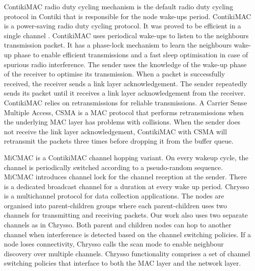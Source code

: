 ContikiMAC \cite{contikimac} radio duty cycling mechanism is the default radio duty cycling protocol in Contiki that is responsible for the node wake-ups period. ContikiMAC is a power-saving radio duty cycling protocol. It was proved to be efficient in a single channel \cite{micmac,orpl}. ContikiMAC uses periodical wake-ups to listen to the neighbours transmission packet. It has a phase-lock mechanism to learn the neighbours wake-up phase to enable efficient transmissions and a fast sleep optimisation in case of spurious radio interference. The sender uses the knowledge of the wake-up phase of the receiver to optimise its transmission. When a packet is successfully received, the receiver sends a link layer acknowledgement. The sender repeatedly sends its packet until it receives a link layer acknowledgement from the receiver. ContikiMAC relies on retransmissions for reliable transmissions. A Carrier Sense Multiple Access, CSMA is a MAC protocol that performs retransmissions when the underlying MAC layer has problems with collisions. When the sender does not receive the link layer acknowledgement, ContikiMAC with CSMA will retransmit the packets three times before dropping it from the buffer queue.




MiCMAC \cite{micmac} is a ContikiMAC \cite{contikimac} channel hopping variant. On every wakeup cycle, the channel is periodically switched according to a pseudo-random sequence. MiCMAC introduces channel lock for the channel reception at the sender. There is a dedicated broadcast channel for a duration at every wake up period. %
Chrysso \cite{chrysso} is a multichannel protocol for data collection applications. The nodes are organised into parent-children groups where each parent-children uses two channels for transmitting and receiving packets. Our work also uses two separate channels as in Chrysso. Both parent and children nodes can hop to another channel when interference is detected based on the channel switching policies. If a node loses connectivity, Chrysso calls the scan mode to enable neighbour discovery over multiple channels. Chrysso functionality comprises a set of channel switching policies that interface to both the MAC layer and the network layer.

